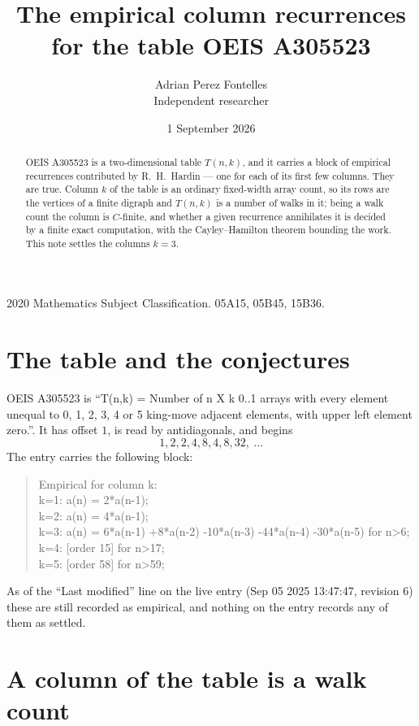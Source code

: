 \documentclass[11pt,a4paper]{article}
\title{The empirical column recurrences for the table OEIS A305523}
\author{Adrian Perez Fontelles\\ \small Independent researcher}
\date{1 September 2026}
\theoremstyle{plain}
\theoremstyle{definition}
\begin{document}
\maketitle

\begin{abstract}
OEIS A305523 is a two-dimensional table $T(n,k)$, and it carries a block of empirical
recurrences contributed by R.~H.~Hardin --- one for each of its first few columns. They are
true. Column $k$ of the table is an ordinary fixed-width array count, so its rows are the
vertices of a finite digraph and $T(n,k)$ is a number of walks in it; being a walk count the
column is $C$-finite, and whether a given recurrence annihilates it is decided by a finite
exact computation, with the Cayley--Hamilton theorem bounding the work. This note settles the columns $k=3$.
\end{abstract}

\noindent\small 2020 Mathematics Subject Classification. 05A15, 05B45, 15B36.\normalsize

\section{The table and the conjectures}

OEIS A305523 is ``T(n,k) = Number of n X k 0..1 arrays with every element unequal to 0, 1, 2, 3, 4 or 5 king-move adjacent elements, with upper left element zero.''. It has offset $1$, is
read by antidiagonals, and begins
\[
1, 2, 2, 4, 8, 4, 8, 32,\ \dots
\]
The entry carries the following block:
\begin{quote}\small
Empirical for column k:\\
k=1: a(n) = 2*a(n-1);\\
k=2: a(n) = 4*a(n-1);\\
k=3: a(n) = 6*a(n-1) +8*a(n-2) -10*a(n-3) -44*a(n-4) -30*a(n-5) for n>6;\\
k=4: [order 15] for n>17;\\
k=5: [order 58] for n>59;\\
\end{quote}
As of the ``Last modified'' line on the live entry (Sep 05 2025 13:47:47, revision 6) these are still
recorded as empirical, and nothing on the entry records any of them as settled.

\section{A column of the table is a walk count}
\end{document}
